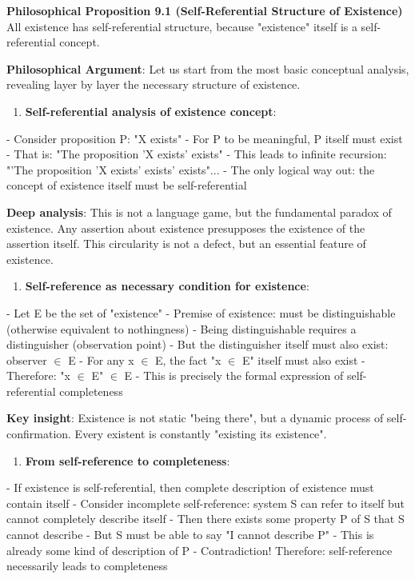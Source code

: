 \textbf{Philosophical Proposition 9.1 (Self-Referential Structure of Existence)}
All existence has self-referential structure, because "existence" itself is a self-referential concept.

\textbf{Philosophical Argument}:
Let us start from the most basic conceptual analysis, revealing layer by layer the necessary structure of existence.

\begin{enumerate}
\item \textbf{Self-referential analysis of existence concept}:
\end{enumerate}
   - Consider proposition P: "X exists"
   - For P to be meaningful, P itself must exist
   - That is: "The proposition 'X exists' exists"
   - This leads to infinite recursion: "'The proposition 'X exists' exists' exists"...
   - The only logical way out: the concept of existence itself must be self-referential
   
   \textbf{Deep analysis}: This is not a language game, but the fundamental paradox of existence.
   Any assertion about existence presupposes the existence of the assertion itself.
   This circularity is not a defect, but an essential feature of existence.

\begin{enumerate}
\item \textbf{Self-reference as necessary condition for existence}:
\end{enumerate}
   - Let E be the set of "existence"
   - Premise of existence: must be distinguishable (otherwise equivalent to nothingness)
   - Being distinguishable requires a distinguisher (observation point)
   - But the distinguisher itself must also exist: observer $\in$ E
   - For any x $\in$ E, the fact "x $\in$ E" itself must also exist
   - Therefore: "x $\in$ E" $\in$ E
   - This is precisely the formal expression of self-referential completeness
   
   \textbf{Key insight}: Existence is not static "being there",
   but a dynamic process of self-confirmation.
   Every existent is constantly "existing its existence".

\begin{enumerate}
\item \textbf{From self-reference to completeness}:
\end{enumerate}
   - If existence is self-referential, then complete description of existence must contain itself
   - Consider incomplete self-reference: system S can refer to itself but cannot completely describe itself
   - Then there exists some property P of S that S cannot describe
   - But S must be able to say "I cannot describe P"
   - This is already some kind of description of P
   - Contradiction! Therefore: self-reference necessarily leads to completeness
   

